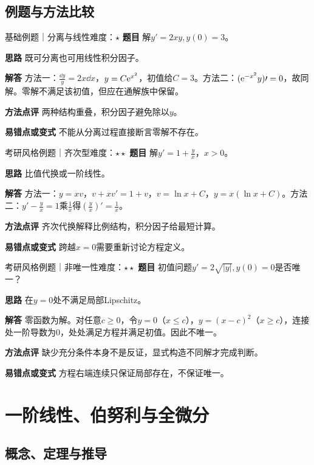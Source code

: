 \subsection{例题与方法比较}
\begin{example}{基础例题｜分离与线性}{难度：$\star$}
\label{ex:4:1}\textbf{题目} 解$y\prime=2xy,y(0)=3$。\par
\textbf{思路} 既可分离也可用线性积分因子。\par
\textbf{解答} 方法一：$\frac{\dd y}{y}=2x\dd x$，$y=C\mathrm{e}^{x^2}$，初值给$C=3$。方法二：$(\mathrm{e}^{-x^2}y)\prime=0$，故同解。零解不满足该初值，但应在通解族中保留。\par
\textbf{方法点评} 两种结构重叠，积分因子避免除以$y$。\par
\textbf{易错点或变式} 不能从分离过程直接断言零解不存在。
\end{example}
\begin{example}{考研风格例题｜齐次型}{难度：$\star\star$}
\label{ex:4:2}\textbf{题目} 解$y\prime=1+\frac{y}{x}$，$x>0$。\par
\textbf{思路} 比值代换或一阶线性。\par
\textbf{解答} 方法一：$y=xv$，$v+xv\prime=1+v$，$v=\ln x+C$，$y=x(\ln x+C)$。方法二：$y\prime-\frac{y}{x}=1$乘$\frac{1}{x}$得$(\frac{y}{x})\prime=\frac{1}{x}$。\par
\textbf{方法点评} 齐次代换解释比例结构，积分因子给最短计算。\par
\textbf{易错点或变式} 跨越$x=0$需要重新讨论方程定义。
\end{example}
\begin{example}{考研风格例题｜非唯一性}{难度：$\star\star$}
\label{ex:4:3}\textbf{题目} 初值问题$y\prime=2\sqrt{|y|},y(0)=0$是否唯一？\par
\textbf{思路} 在$y=0$处不满足局部Lipschitz。\par
\textbf{解答} 零函数为解。对任意$c\ge0$，令$y=0$（$x\le c$），$y=(x-c)^2$（$x\ge c$），连接处一阶导数为0，处处满足方程并满足初值。因此不唯一。\par
\textbf{方法点评} 缺少充分条件本身不是反证，显式构造不同解才完成判断。\par
\textbf{易错点或变式} 方程右端连续只保证局部存在，不保证唯一。
\end{example}
\section{一阶线性、伯努利与全微分}\label{sec:4:2}
\subsection{概念、定理与推导}

